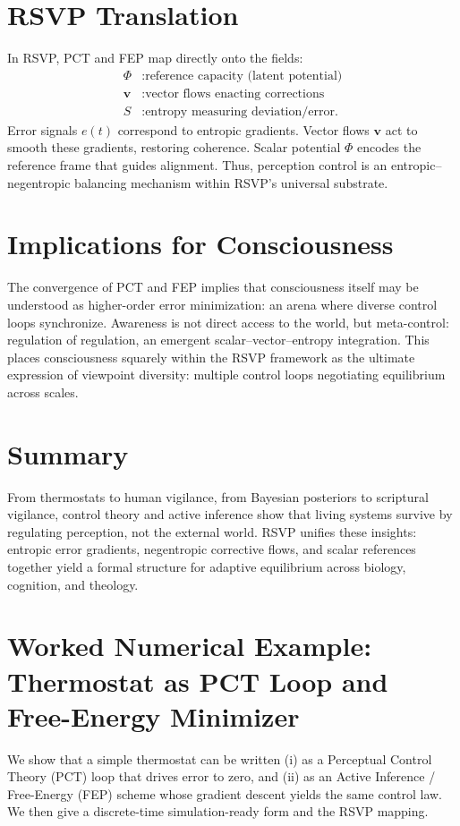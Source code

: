 \documentclass[a4paper,11pt,openany]{book}
\begin{document}
\section{RSVP Translation}
In RSVP, PCT and FEP map directly onto the fields:
\begin{align*}
\Phi &: \text{reference capacity (latent potential)} \\
\mathbf{v} &: \text{vector flows enacting corrections} \\
S &: \text{entropy measuring deviation/error.}
\end{align*}
Error signals $e(t)$ correspond to entropic gradients. Vector flows $\mathbf{v}$ act to 
smooth these gradients, restoring coherence. Scalar potential $\Phi$ encodes the reference 
frame that guides alignment. Thus, perception control is an entropic–negentropic balancing 
mechanism within RSVP’s universal substrate.

\section{Implications for Consciousness}
The convergence of PCT and FEP implies that consciousness itself may be understood as 
higher-order error minimization: an arena where diverse control loops synchronize.  
Awareness is not direct access to the world, but meta-control: regulation of regulation, 
an emergent scalar–vector–entropy integration. This places consciousness squarely within 
the RSVP framework as the ultimate expression of viewpoint diversity:  
multiple control loops negotiating equilibrium across scales.

\section{Summary}
From thermostats to human vigilance, from Bayesian posteriors to scriptural vigilance, 
control theory and active inference show that living systems survive by regulating 
perception, not the external world. RSVP unifies these insights: entropic error gradients, 
negentropic corrective flows, and scalar references together yield a formal structure for 
adaptive equilibrium across biology, cognition, and theology.

\section{Worked Numerical Example: Thermostat as PCT Loop and Free-Energy Minimizer}

We show that a simple thermostat can be written (i) as a Perceptual Control Theory (PCT) loop that drives error to zero, and (ii) as an Active Inference / Free-Energy (FEP) scheme whose gradient descent yields the same control law. We then give a discrete-time simulation-ready form and the RSVP mapping.
\end{document}
